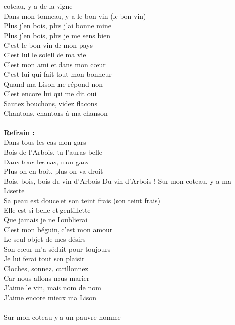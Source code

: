 
 coteau, y a de la vigne
\\Dans mon tonneau, y a le bon vin (le bon vin)
\\Plus j'en bois, plus j'ai bonne mine
\\Plus j'en bois, plus je me sens bien
\\C'est le bon vin de mon pays
\\C'est lui le soleil de ma vie
\\C'est mon ami et dans mon cœur
\\C'est lui qui fait tout mon bonheur
\\Quand ma Lison me répond non
\\C'est encore lui qui me dit oui
\\Sautez bouchons, videz flacons
\\Chantons, chantons à ma chanson
\\\\\textbf{Refrain :}
\\Dans tous les cas mon gars
\\Bois de l'Arbois, tu l'auras belle
\\Dans tous les cas, mon gars
\\Plus on en boit, plus on va droit
\\
{Bois, bois, bois du vin d'Arbois}
Du vin d'Arbois !
\breakpage
Sur mon coteau, y a ma Lisette
\\Sa peau est douce et son teint frais (son teint frais)
\\Elle est si belle et gentillette
\\Que jamais je ne l'oublierai
\\C'est mon béguin, c'est mon amour
\\Le seul objet de mes désirs
\\Son cœur m'a séduit pour toujours
\\Je lui ferai tout son plaisir
\\Cloches, sonnez, carillonnez
\\Car nous allons nous marier
\\J'aime le vin, mais nom de nom
\\J'aime encore mieux ma Lison
\\\\Sur mon coteau y a un pauvre homme
